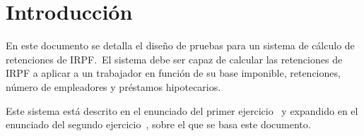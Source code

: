 \chapter{Introducción}
En este documento se detalla el diseño de pruebas para un sistema de cálculo de retenciones de IRPF.~El sistema
debe ser capaz de calcular las retenciones de IRPF a aplicar a un trabajador en función de su base imponible,
retenciones, número de empleadores y préstamos hipotecarios.

Este sistema está descrito en el enunciado del primer ejercicio~\cite{enunciado1} y expandido en el enunciado
del segundo ejercicio~\cite{enunciado2}, sobre el que se basa este documento.

